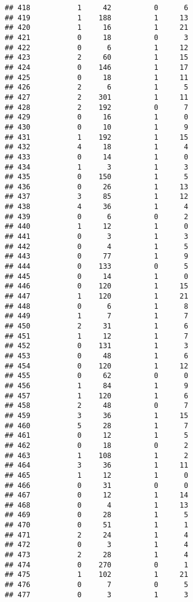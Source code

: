 \documentclass[]{article}
\begin{document}
\begin{verbatim}
## 418           1     42          0      6
## 419           1    188          1     13
## 420           1     16          1     21
## 421           0     18          0      3
## 422           0      6          1     12
## 423           2     60          1     15
## 424           0    146          1     17
## 425           0     18          1     11
## 426           2      6          1      5
## 427           2    301          1     11
## 428           2    192          0      7
## 429           0     16          1      0
## 430           0     10          1      9
## 431           1    192          1     15
## 432           4     18          1      4
## 433           0     14          1      0
## 434           1      3          1      3
## 435           0    150          1      5
## 436           0     26          1     13
## 437           3     85          1     12
## 438           4     36          1      4
## 439           0      6          0      2
## 440           1     12          1      0
## 441           0      3          1      3
## 442           0      4          1      5
## 443           0     77          1      9
## 444           0    133          0      5
## 445           0     14          1      0
## 446           0    120          1     15
## 447           1    120          1     21
## 448           0      6          1      8
## 449           1      7          1      7
## 450           2     31          1      6
## 451           1     12          1      7
## 452           0    131          1      3
## 453           0     48          1      6
## 454           0    120          1     12
## 455           0     62          0      0
## 456           1     84          1      9
## 457           1    120          1      6
## 458           2     48          0      7
## 459           3     36          1     15
## 460           5     28          1      7
## 461           0     12          1      5
## 462           0     18          0      2
## 463           1    108          1      2
## 464           3     36          1     11
## 465           1     12          1      0
## 466           0     31          0      0
## 467           0     12          1     14
## 468           0      4          1     13
## 469           0     28          1      5
## 470           0     51          1      1
## 471           2     24          1      4
## 472           0      3          1      4
## 473           2     28          1      4
## 474           0    270          0      1
## 475           1    102          1     21
## 476           0      7          0      5
## 477           0      3          1      3

\end{verbatim}
\end{document}
